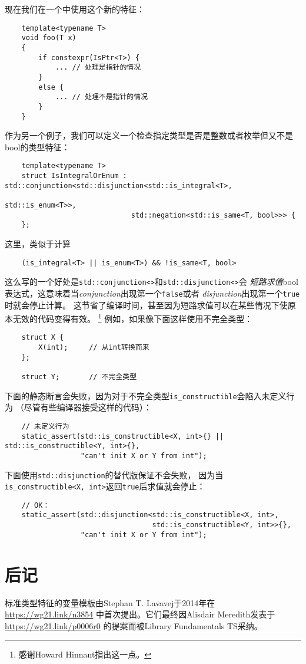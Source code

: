 现在我们在一个中使用这个新的特征：
\begin{lstlisting}
    template<typename T>
    void foo(T x)
    {
        if constexpr(IsPtr<T>) {
            ... // 处理是指针的情况
        }
        else {
            ... // 处理不是指针的情况
        }
    }
\end{lstlisting}
作为另一个例子，我们可以定义一个检查指定类型是否是整数或者枚举但又不是bool的类型特征：
\begin{lstlisting}
    template<typename T>
    struct IsIntegralOrEnum : std::conjunction<std::disjunction<std::is_integral<T>,
                                                                std::is_enum<T>>,
                              std::negation<std::is_same<T, bool>>> {
    };
\end{lstlisting}
这里，类似于计算
\begin{lstlisting}
    (is_integral<T> || is_enum<T>) && !is_same<T, bool>
\end{lstlisting}
这么写的一个好处是\texttt{std::conjunction<>}和\texttt{std::disjunction<>}会
\emph{短路求值}bool表达式，这意味着当\emph{conjunction}出现第一个\texttt{false}或者
\emph{disjunction}出现第一个\texttt{true}时就会停止计算。
这节省了编译时间，甚至因为短路求值可以在某些情况下使原本无效的代码变得有效。
\footnote{感谢Howard Hinnant指出这一点。}
例如，如果像下面这样使用不完全类型：
\begin{lstlisting}
    struct X {
        X(int);     // 从int转换而来
    };

    struct Y;       // 不完全类型
\end{lstlisting}
下面的静态断言会失败，因为对于不完全类型\texttt{is\_constructible}会陷入未定义行为
（尽管有些编译器接受这样的代码）：
\begin{lstlisting}
    // 未定义行为
    static_assert(std::is_constructible<X, int>{} || std::is_constructible<Y, int>{},
                  "can't init X or Y from int");
\end{lstlisting}
下面使用\texttt{std::disjunction}的替代版保证不会失败，
因为当\texttt{is\_constructible<X, int>}返回\texttt{true}后求值就会停止：
\begin{lstlisting}
    // OK：
    static_assert(std::disjunction<std::is_constructible<X, int>,
                                   std::is_constructible<Y, int>>{},
                  "can't init X or Y from int");
\end{lstlisting}

\section{后记}
标准类型特征的变量模板由Stephan T. Lavavej于2014年在\url{https://wg21.link/n3854}
中首次提出。它们最终因Alisdair Meredith发表于\url{https://wg21.link/p0006r0}
的提案而被Library Fundamentals TS采纳。

